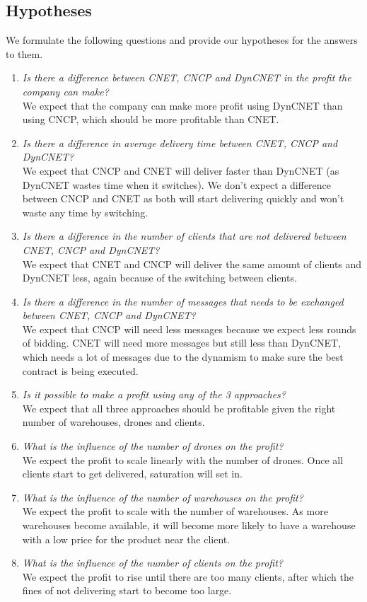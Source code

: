 \documentclass[10pt,a4paper]{article}
\begin{document}
\subsection{Hypotheses}
We formulate the following questions and provide our hypotheses for the answers to them.
\begin{enumerate}
\item \textit{Is there a difference between CNET, CNCP and DynCNET in the profit the company can make?} \\
We expect that the company can make more profit using DynCNET than using CNCP, which should be more profitable than CNET.
\item\textit{Is there a difference in average delivery time between CNET, CNCP and DynCNET?} \\
We expect that CNCP and CNET will deliver faster than DynCNET (as DynCNET wastes time when it switches). We don't expect a difference between CNCP and CNET as both will start delivering quickly and won't waste any time by switching.

\item\textit{Is there a difference in the number of clients that are not delivered between CNET, CNCP and DynCNET?} \\
We expect that CNET and CNCP will deliver the same amount of clients and DynCNET less, again because of the switching between clients.

\item\textit{Is there a difference in the number of messages that needs to be exchanged between CNET, CNCP and DynCNET?}\\
We expect that CNCP will need less messages because we expect less rounds of bidding. CNET will need more messages but still less than DynCNET, which needs a lot of messages due to the dynamism to make sure the best contract is being executed. 

\item\textit{Is it possible to make a profit using any of the 3 approaches?}\\
We expect that all three approaches should be profitable given the right number of warehouses, drones and clients.

\item\textit{What is the influence of the number of drones on the profit?}\\
We expect the profit to scale linearly with the number of drones. Once all clients start to get delivered, saturation will set in.

\item\textit{What is the influence of the number of warehouses on the profit?}\\
We expect the profit to scale with the number of warehouses. As more warehouses become available, it will become more likely to have a warehouse with a low price for the product near the client.

\item\textit{What is the influence of the number of clients on the profit?}\\
We expect the profit to rise until there are too many clients, after which the fines of not delivering start to become too large.
\end{enumerate}
\end{document}
